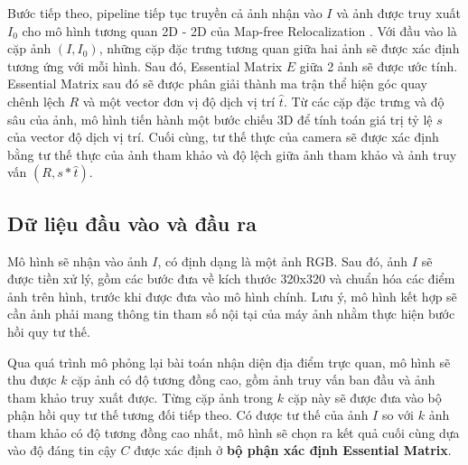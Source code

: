 Bước tiếp theo, pipeline tiếp tục truyền cả ảnh nhận vào $I$ và ảnh được truy xuất $I_0$ cho mô hình tương quan 2D - 2D của Map-free Relocalization \cite{arnold2022mapfree}. Với đầu vào là cặp ảnh $(I, I_0)$, những cặp đặc trưng tương quan giữa hai ảnh sẽ được xác định tương ứng với mỗi hình. Sau đó, Essential Matrix $E$ giữa 2 ảnh sẽ được ước tính. Essential Matrix sau đó sẽ được phân giải thành ma trận thể hiện góc quay chênh lệch $R$ và một vector đơn vị độ dịch vị trí $\hat{t}$. Từ các cặp đặc trưng và độ sâu của ảnh, mô hình tiến hành một bước chiếu 3D để tính toán giá trị tỷ lệ $s$ của vector độ dịch vị trí. Cuối cùng, tư thế thực của camera sẽ được xác định bằng tư thế thực của ảnh tham khảo và độ lệch giữa ảnh tham khảo và ảnh truy vấn $(R,s*\hat{t})$.

\subsection{Dữ liệu đầu vào và đầu ra}
Mô hình sẽ nhận vào ảnh $I$, có định dạng là một ảnh RGB. Sau đó, ảnh $I$ sẽ được tiền xử lý, gồm các bước đưa về kích thước 320x320 và chuẩn hóa các điểm ảnh trên hình, trước khi được đưa vào mô hình chính. Lưu ý, mô hình kết hợp sẽ cần ảnh phải mang thông tin tham số nội tại của máy ảnh nhằm thực hiện bước hồi quy tư thế.

Qua quá trình mô phỏng lại bài toán nhận diện địa điểm trực quan, mô hình sẽ thu được $k$ cặp ảnh có độ tương đồng cao, gồm ảnh truy vấn ban đầu và ảnh tham khảo truy xuất được. Từng cặp ảnh trong $k$ cặp này sẽ được đưa vào bộ phận hồi quy tư thế tương đối tiếp theo. Có được tư thế của ảnh $I$ so với $k$ ảnh tham khảo có độ tương đồng cao nhất, mô hình sẽ chọn ra kết quả cuối cùng dựa vào độ đáng tin cậy $C$ được xác định ở \textbf{bộ phận xác định Essential Matrix}.

